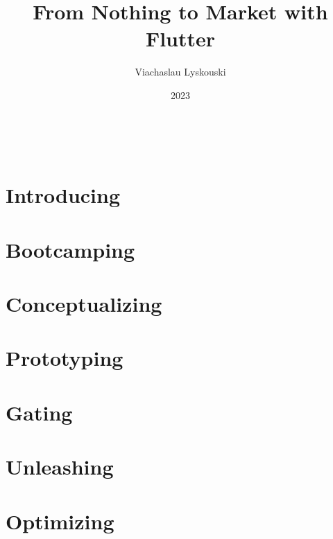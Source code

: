 \documentclass[12pt, a4paper, twoside]{extreport}
\author{Viachaslau Lyskouski}
\title{From Nothing to Market with Flutter}
\date{2023}
\begin{document}
\thispagestyle{empty}
~
\newpage



\tableofcontents

\newpage
\section*{Introducing}


\newpage
\section{Bootcamping}



\newpage
\section{Conceptualizing}


\newpage
\section{Prototyping}


\newpage





\newpage
\section{Gating}







\newpage
\section{Unleashing}







\newpage
\section{Optimizing}








\end{document}
